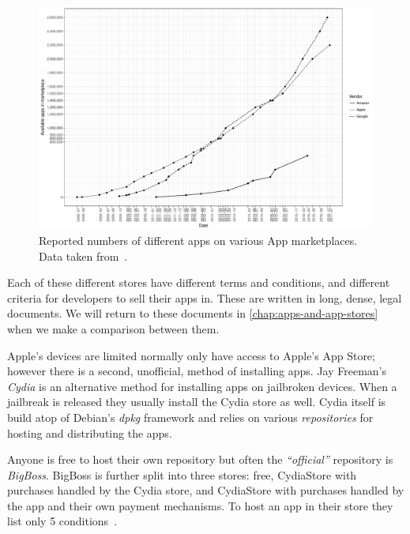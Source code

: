 \documentclass[thesis.tex]{subfiles}
\begin{document}
\begin{figure}
  \includegraphics[width=\textwidth]{figures/app-store-apps.pdf}
  \caption[Reported numbers of different apps on various App marketplaces.]{%
    Reported numbers of different apps on various App marketplaces. Data taken from~\cite{statista_google_nodate,statista_apple_nodate,statista_amazon_nodate}.}
  \label{fig:app-store-apps}
\end{figure}

Each of these different stores have different terms and conditions,
and different criteria for developers to sell their apps in.  These
are written in long, dense, legal documents. We will return to these
documents in \autoref{chap:apps-and-app-stores} when we make a
comparison between them.

Apple's devices are limited normally only have access to Apple's App
Store; however there is a second, unofficial, method of installing
apps.  Jay Freeman's \emph{Cydia} is an alternative method for
installing apps on jailbroken devices.  When a jailbreak is released
they usually install the Cydia store as well.  Cydia itself is build
atop of Debian's \emph{dpkg} framework and relies on various
\emph{repositories} for hosting and distributing the apps.

Anyone is free to host their own repository but often the
\emph{``official''} repository is \emph{BigBoss}.  BigBoss is further
split into three stores: free, CydiaStore with purchases handled by
the Cydia store, and CydiaStore with purchases handled by the app and
their own payment mechanisms.  To host an app in their store they list
only 5 conditions~\cite{bigboss_host_2014}.
\end{document}
